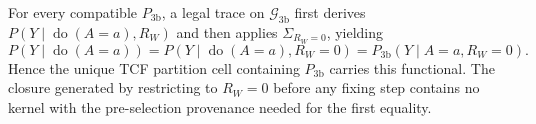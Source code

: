 For every compatible \(P_{\mathrm{3b}}\), a legal trace on \(\mathcal G_{\mathrm{3b}}\) first derives \(P(Y\mid\operatorname{do}(A=a),R_W)\) and then applies \(\Sigma_{R_W=0}\), yielding \[P(Y\mid\operatorname{do}(A=a))=P(Y\mid\operatorname{do}(A=a),R_W=0)=P_{\mathrm{3b}}(Y\mid A=a,R_W=0).\] Hence the unique TCF partition cell containing \(P_{\mathrm{3b}}\) carries this functional. The closure generated by restricting to \(R_W=0\) before any fixing step contains no kernel with the pre-selection provenance needed for the first equality.